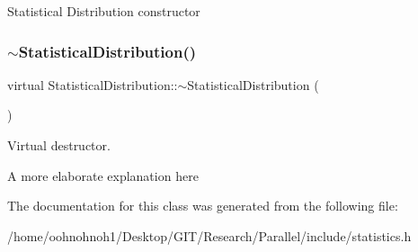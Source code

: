 Statistical Distribution constructor \mbox{\label{classStatisticalDistribution_a0e7be123394637fb1bef9e7a23cc5618}} 
\subsubsection{\texorpdfstring{$\sim$\+Statistical\+Distribution()}{~StatisticalDistribution()}}
{\footnotesize\ttfamily virtual Statistical\+Distribution\+::$\sim$\+Statistical\+Distribution (\begin{DoxyParamCaption}{ }\end{DoxyParamCaption})\hspace{0.3cm}{\ttfamily [virtual]}}



Virtual destructor. 

A more elaborate explanation here 

The documentation for this class was generated from the following file\+:\begin{DoxyCompactItemize}
\item 
/home/oohnohnoh1/\+Desktop/\+G\+I\+T/\+Research/\+Parallel/include/statistics.\+h\end{DoxyCompactItemize}

